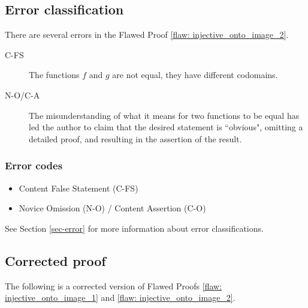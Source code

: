 \clearpage
\subsection{Error classification}



There are several errors
 in the Flawed Proof \ref{flaw: injective_onto_image_2}.
 
 \begin{description}
    \item[C-FS] The functions $f$ and $g$ are not equal, they have different codomains.
    \item[N-O/C-A] The misunderstanding of what it means for two functions to be equal has led the author to claim that the desired statement is ``obvious", omitting a detailed proof, and resulting in the assertion of the result.
 \end{description}

 
\subsubsection{Error codes}
\begin{itemize}
    \item  Content False Statement (C-FS)
    \item Novice Omission (N-O) / Content Assertion (C-O)
\end{itemize}
See Section \ref{sec-error} for more information about error classifications.

\clearpage



\subsection{Corrected proof}

The following is a corrected version of Flawed Proofs \ref{flaw: injective_onto_image_1} and  \ref{flaw: injective_onto_image_2}. 

